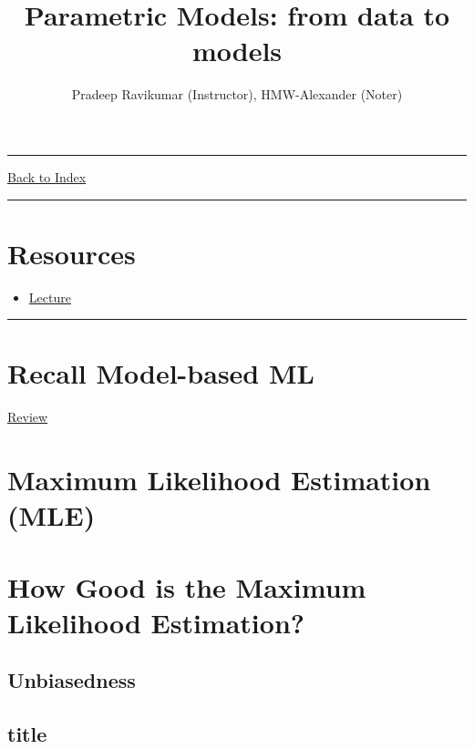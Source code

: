 \documentclass[letterpaper,10pt]{article}
\title{\textbf{Parametric Models: from data to models}}
\author{Pradeep Ravikumar (Instructor), HMW-Alexander (Noter)}
\newcommand{\panhline}{\begin{center}\rule{\textwidth}{1pt}\end{center}}
\begin{document}
\maketitle

\panhline
\href{../index.html}{Back to Index}

\panhline
\tableofcontents

\section*{Resources}

\begin{itemize}
	\item \href{../../Lectures/02_ParametricModels.pdf}{Lecture}
\end{itemize}

\panhline

\section{Recall Model-based ML}
	
\href{../01_Introduction/document.html}{Review}

\section{Maximum Likelihood Estimation (MLE)}



\section{How Good is the Maximum Likelihood Estimation?}

\subsection{Unbiasedness}

\subsection{title}

	
\end{document}
